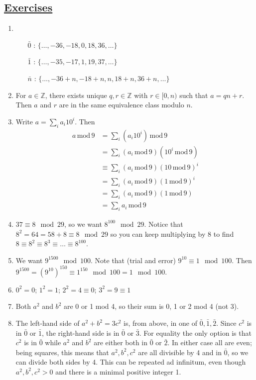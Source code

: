 \documentclass[]{article}
\newcommand{\md}{\,\text{mod}\,}
\newcommand{\bbz}{\mathbb{Z}}
\begin{document}
\subsection*{\underline{Exercises}}
\begin{enumerate}
\item \begin{enumerate}
\item[$\bar{0}$]: $\{ \ldots, -36, -18, 0, 18, 36, \ldots \}$ 
\item[$\bar{1}$]: $\{ \ldots, -35, -17, 1, 19, 37, \ldots \}$ 
\item[$\bar{n}$]: $\{ \ldots, -36+n, -18+n, n, 18+n, 36+n, \ldots \}$ 
\end{enumerate}
\item For $a \in \bbz$, there exists unique $q,r\in \bbz$ with $r\in [0,n)$ such that $a = qn+r$. Then $a$ and $r$ are in the same equivalence class modulo $n$.
\item Write $a = \sum_i a_i10^i$. Then 
\begin{align}
a\md 9 &= \sum_i \left(a_i10^i\right)\md 9 \\
&= \sum_i \left(a_i \md 9\right) \left(10^i \md 9\right) \\
&\equiv \sum_i \left(a_i\md 9\right) \left(10\md 9\right)^i \\
&= \sum_i \left(a_i\md 9\right) \left(1\md 9\right)^i \\
&= \sum_i \left(a_i\md 9\right) \left(1\md 9\right) \\
&= \sum_i a_i\md 9
\end{align}
\item $37 \equiv 8\mod 29$, so we want $8^{100}\mod 29$. Notice that $8^2 = 64 = 58+8 \equiv 8\mod 29$ so you can keep multiplying by 8 to find $8 \equiv 8^2 \equiv 8^3 \equiv \ldots \equiv 8^{100}$.
\item We want $9^{1500}\mod 100$. Note that (trial and error) $9^10 \equiv 1\mod 100$. Then $9^{1500} = (9^{10})^{150} \equiv 1^{150}\mod 100 = 1\mod 100$.
\item $0^2 = 0$; $1^2 = 1$; $2^2 = 4 \equiv 0$; $3^2 = 9 \equiv 1$
\item Both $a^2$ and $b^2$ are 0 or 1 mod 4, so their sum is 0, 1 or 2 mod 4 (not 3).
\item The left-hand side of $a^2 + b^2 = 3c^2$ is, from above, in one of $\bar{0}, \bar{1}, \bar{2}$. Since $c^2$ is in $\bar{0}$ or $\bar{1}$, the right-hand side is in $\bar{0}$ or $\bar{3}$. For equality the only option is that $c^2$ is in $\bar{0}$ while $a^2$ and $b^2$ are either both in $\bar{0}$ or $\bar{2}$. In either case all are even; being squares, this means that $a^2, b^2, c^2$ are all divisible by 4 and in $\bar{0}$, so we can divide both sides by 4. This can be repeated ad infinitum, even though $a^2, b^2, c^2 > 0$ and there is a minimal positive integer 1.

\end{enumerate}
\end{document}
